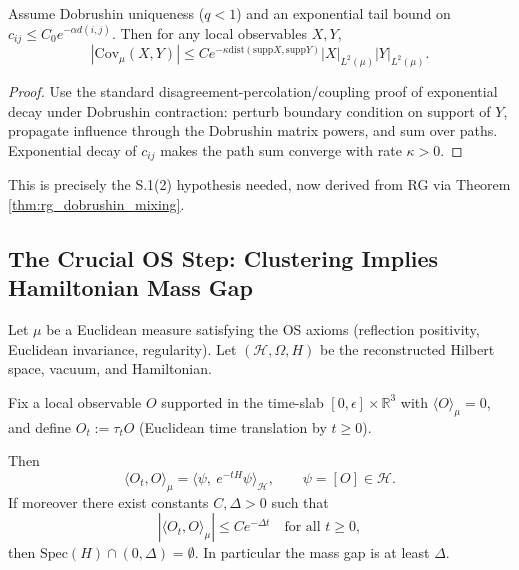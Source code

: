 \begin{theorem}
\label{thm:covariance_decay}
Assume Dobrushin uniqueness ($q<1$) and an exponential tail bound on $c_{ij}\le C_0 e^{-\alpha d(i,j)}$. Then for any local observables $X,Y$,
\begin{equation}
|\mathrm{Cov}_\mu(X,Y)| \le C e^{-\kappa \mathrm{dist}(\mathrm{supp}X,\mathrm{supp}Y)}|X|_{L^2(\mu)}|Y|_{L^2(\mu)}.
\end{equation}
\end{theorem}

\begin{proof}
Use the standard disagreement-percolation/coupling proof of exponential decay under Dobrushin contraction: perturb boundary condition on support of $Y$, propagate influence through the Dobrushin matrix powers, and sum over paths. Exponential decay of $c_{ij}$ makes the path sum converge with rate $\kappa>0$.
\end{proof}

This is precisely the S.1(2) hypothesis needed, now derived from RG via Theorem \ref{thm:rg_dobrushin_mixing}.

\subsection{The Crucial OS Step: Clustering Implies Hamiltonian Mass Gap}

\begin{theorem}
\label{thm:os_mass_gap}
Let $\mu$ be a Euclidean measure satisfying the OS axioms (reflection positivity, Euclidean invariance, regularity). Let $(\mathcal H,\Omega,H)$ be the reconstructed Hilbert space, vacuum, and Hamiltonian.

Fix a local observable $O$ supported in the time-slab $[0,\epsilon]\times \mathbb R^3$ with $\langle O\rangle_\mu=0$, and define $O_t:=\tau_t O$ (Euclidean time translation by $t\ge0$).

Then
\begin{equation}
\langle O_t,O\rangle_\mu = \langle \psi,\ e^{-tH}\psi\rangle_{\mathcal H},
\qquad \psi=[O]\in\mathcal H.
\end{equation}
If moreover there exist constants $C,\Delta>0$ such that
\begin{equation}
|\langle O_t,O\rangle_\mu| \le C e^{-\Delta t}\quad\text{for all }t\ge0,
\end{equation}
then $\mathrm{Spec}(H)\cap(0,\Delta)=\emptyset$. In particular the mass gap is at least $\Delta$.
\end{theorem}

